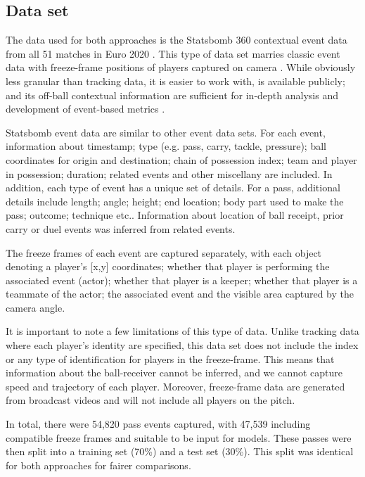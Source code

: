 \documentclass[conference]{IEEEtran}
\begin{document}
\subsection{Data set}\label{data}


The data used for both approaches is the Statsbomb 360 contextual event data from all 51 matches in Euro 2020 \parencite{opendata}. This type of data set marries classic event data with freeze-frame positions of players captured on camera \parencite{statsbomb_360}. While obviously less granular than tracking data, it is easier to work with, is available publicly; and its off-ball contextual information are sufficient for in-depth analysis and development of event-based metrics \parencite{statsbomb_pass}. 

Statsbomb event data are similar to other event data sets. For each event, information about timestamp; type (e.g. pass, carry, tackle, pressure); ball coordinates for origin and destination; chain of possession index; team and player in possession; duration; related events and other miscellany are included. In addition, each type of event has a unique set of details. For a pass, additional details include length; angle; height; end location; body part used to make the pass; outcome; technique etc.. Information about location of ball receipt, prior carry or duel events was inferred from related events. 

The freeze frames of each event are captured separately, with each object denoting a player's [x,y] coordinates; whether that player is performing the associated event (actor); whether that player is a keeper; whether that player is a teammate of the actor; the associated event and the visible area captured by the camera angle. 

It is important to note a few limitations of this type of data. Unlike tracking data where each player's identity are specified, this data set does not include the index or any type of identification for players in the freeze-frame. This means that information about the ball-receiver cannot be inferred, and we cannot capture speed and trajectory of each player. Moreover, freeze-frame data are generated from broadcast videos and will not include all players on the pitch. 

In total, there were 54,820 pass events captured, with 47,539 including compatible freeze frames and suitable to be input for models. These passes were then split into a training set (70\%) and a test set (30\%). This split was identical for both approaches for fairer comparisons.
\end{document}
